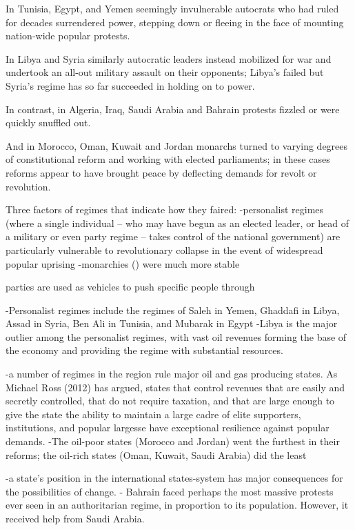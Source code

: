 In Tunisia, Egypt, and Yemen seemingly invulnerable autocrats who had ruled for decades surrendered power, stepping down or fleeing in the face of mounting nation-wide popular protests. 

In Libya and Syria similarly autocratic leaders instead mobilized for war and undertook an all-out military assault on their opponents; Libya’s failed but Syria’s regime has so far succeeded in holding on to power. 

In contrast, in Algeria, Iraq, Saudi Arabia and Bahrain protests fizzled or were quickly snuffled out. 

And in Morocco, Oman, Kuwait and Jordan monarchs turned to varying degrees of constitutional reform and working with elected parliaments; in these cases reforms appear to have brought peace by deflecting demands for revolt or revolution.

Three factors of regimes that indicate how they faired:
-personalist regimes (where a single individual – who may have begun as an elected leader, or head of a military or even party regime – takes control of the national government) are particularly vulnerable to revolutionary collapse in the event of widespread popular uprising
    -monarchies () were much more stable
    
    parties are used as vehicles to push specific people through 
    
    -Personalist regimes include the regimes of Saleh in Yemen, Ghaddafi in Libya, Assad in Syria, Ben Ali in Tunisia, and Mubarak in Egypt
    -Libya is the major outlier among the personalist regimes, with vast oil revenues forming the base of the economy and providing the regime with substantial resources.
    
-a number of regimes in the region rule major oil and gas producing states. As Michael Ross (2012) has argued, states that control revenues that are easily and secretly controlled, that do not require taxation, and that are large enough to give the state the ability to maintain a large cadre of elite supporters, institutions, and popular largesse have exceptional resilience against popular demands.
    -The oil-poor states (Morocco and Jordan) went the furthest in their reforms; the oil-rich states (Oman, Kuwait, Saudi Arabia) did the least
    
-a state’s position in the international states-system has major consequences for the possibilities of change.
    - Bahrain faced perhaps the most massive protests ever seen in an authoritarian regime, in proportion to its population. However, it received help from Saudi Arabia.

